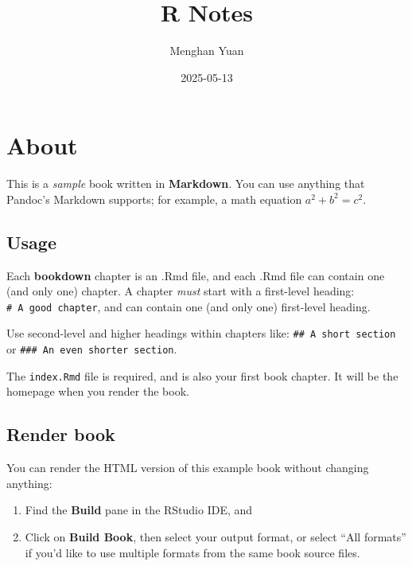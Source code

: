 \documentclass[
  a4paper,
  twoside,
  openright]{book}
\title{R Notes}
\author{Menghan Yuan}
\date{2025-05-13}
\providecommand{\tightlist}{%
  \setlength{\itemsep}{0pt}\setlength{\parskip}{0pt}}
\theoremstyle{definition}
\theoremstyle{definition}
\theoremstyle{definition}
\theoremstyle{definition}
\theoremstyle{remark}
\begin{document}
\maketitle

\let\tightlist\relax
\renewenvironment{Shaded}{\vspace{0.2\baselineskip}\begin{snugshade}}{\end{snugshade}}

% 
% 
% 

{
\setcounter{tocdepth}{1}
\tableofcontents
}
\chapter{About}\label{about}

This is a \emph{sample} book written in \textbf{Markdown}. You can use anything that Pandoc's Markdown supports; for example, a math equation \(a^2 + b^2 = c^2\).

\section{Usage}\label{usage}

Each \textbf{bookdown} chapter is an .Rmd file, and each .Rmd file can contain one (and only one) chapter. A chapter \emph{must} start with a first-level heading: \texttt{\#\ A\ good\ chapter}, and can contain one (and only one) first-level heading.

Use second-level and higher headings within chapters like: \texttt{\#\#\ A\ short\ section} or \texttt{\#\#\#\ An\ even\ shorter\ section}.

The \texttt{index.Rmd} file is required, and is also your first book chapter. It will be the homepage when you render the book.

\section{Render book}\label{render-book}

You can render the HTML version of this example book without changing anything:

\begin{enumerate}
\def\labelenumi{\arabic{enumi}.}
\item
  Find the \textbf{Build} pane in the RStudio IDE, and
\item
  Click on \textbf{Build Book}, then select your output format, or select ``All formats'' if you'd like to use multiple formats from the same book source files.
\end{enumerate}
\end{document}
